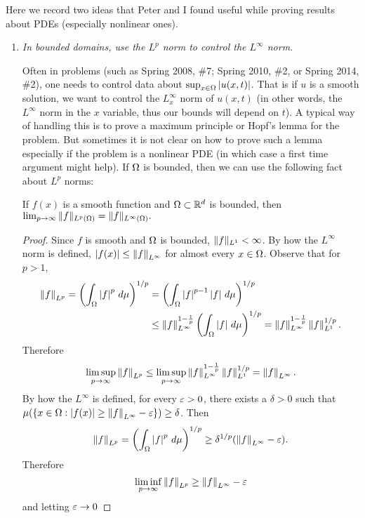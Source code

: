 \noindent Here we record two ideas that Peter and I found useful while proving results about PDEs (especially nonlinear ones).
\begin{enumerate}[$(1)$]
\item \emph{In bounded domains, use the $L^{p}$ norm to control the $L^{\infty}$ norm.}

Often in problems (such as Spring 2008, \#7; Spring 2010, \#2, or Spring 2014, \#2), one needs to control data about $\sup_{x \in \Omega}|u(x, t)|$.
That is if $u$ is a smooth solution, we want to control the $L_{x}^{\infty}$ norm of $u(x, t)$ (in other words, the $L^{\infty}$ norm in the $x$
variable, thus our bounds will depend on $t$).
A typical way of handling this is to prove a maximum principle or Hopf's lemma for the problem. But sometimes it is not clear on how to
prove such a lemma especially if the problem is a nonlinear PDE (in which case a first time argument might help).
If $\Omega$ is bounded, then we can use the following fact about $L^{p}$ norms:
\begin{lemma}
If $f(x)$ is a smooth function and $\Omega \subset \mathbb{R}^{d}$ is bounded, then
$\lim_{p \rightarrow \infty}\| f \|_{L^{p}(\Omega)} = \| f \|_{L^{\infty}(\Omega)}.$
\end{lemma}
\begin{proof}
Since $f$ is smooth and $\Omega$ is bounded, $\| f \|_{L^{1}} < \infty$.
By how the $L^{\infty}$ norm is defined, $\left|f(x)\right| \leq \left\|f\right\|_{L^{\infty}}$ for almost every $x \in \Omega$. Observe that for $p > 1$,
\begin{align*}
\left\|f\right\|_{L^{p}} = \left(\int_{\Omega}\left|f\right|^{p}\, d\mu\right)^{1/p} &= \left(\int_{\Omega}\left|f\right|^{p - 1}\left|f\right|\, d\mu\right)^{1/p}\\
& \leq \left\|f\right\|_{L^{\infty}}^{1 - \frac{1}{p}}\left(\int_{\Omega}\left|f\right|\, d\mu\right)^{1/p} = \left\|f\right\|_{L^{\infty}}^{1 - \frac{1}{p}}\left\|f\right\|_{L^{1}}^{1/p}.
\end{align*}
Therefore $$\limsup_{p \rightarrow \infty}\left\|f\right\|_{L^{p}} \leq \limsup_{p \rightarrow \infty}\left\|f\right\|_{L^{\infty}}^{1 - \frac{1}{p}}\left\|f\right\|_{L^{1}}^{1/p} = \left\|f\right\|_{L^{\infty}}.$$
By how the $L^{\infty}$ is defined, for every $\varepsilon > 0$, there exists a $\delta > 0$ such that
$\mu(\{x \in \Omega: \left|f(x)\right| \geq \left\|f\right\|_{L^{\infty}} - \varepsilon\}) \geq \delta$. Then
$$\left\|f\right\|_{L^{p}} = \left(\int_{\Omega}\left|f\right|^{p}\, d\mu\right)^{1/p} \geq \delta^{1/p}(\left\|f\right\|_{L^{\infty}} - \varepsilon).$$
Therefore $$\liminf_{p \rightarrow \infty}\left\|f\right\|_{L^{p}} \geq \left\|f\right\|_{L^{\infty}} - \varepsilon$$ and letting $\varepsilon \rightarrow 0$

\end{proof}
\end{enumerate}
